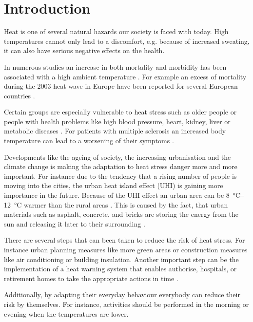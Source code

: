 
\section{Introduction}

Heat is one of several natural hazards our society is faced with today. High temperatures cannot only lead to a discomfort, e.g. because of increased sweating, it can also have serious negative effects on the health. 

In numerous studies an increase in both mortality and
morbidity has been associated with a high ambient temperature \parencite{Zacharias2014,Basu2009}. For example an excess of mortality during the 2003 heat wave in Europe have been reported for several European countries \parencite{Johnson2005,Kovats2004}. 

Certain groups are especially vulnerable to heat stress such as older people or people with health problems like high blood pressure,  heart, kidney, liver or
metabolic diseases  \parencite{Ebi2004,Huebler2007}. For patients with multiple sclerosis an increased body temperature can lead to a worsening of their symptoms \parencite{Guthrie1995,Davis2010}.

Developments like the ageing of society, the increasing urbanisation and the climate change is making the adaptation to heat stress danger more and more important. For instance due to the tendency that a rising number of people is moving into the cities, the urban heat island effect (UHI) is gaining more importance in the future. Because of the UHI effect an urban area can be  \SIrange{8}{12}{\celsius} warmer than the rural areas \parencite{Prashad2014}. This is caused by the fact, that urban materials such as asphalt, concrete, and bricks are storing the energy from the sun and releasing it later to their surrounding \parencite{Prashad2014}. 

There are several steps that can been taken to reduce the risk of heat stress. For instance urban planning measures like more green areas or construction measures like air conditioning or building insulation. Another important step can be the implementation of a heat warning system that enables authorise, hospitals, or retirement homes to take the appropriate actions in time \parencite{Ebi2004}.

Additionally, by adapting their everyday behaviour everybody can reduce their risk by themselves. For instance, activities should be performed in the morning or evening when the temperatures are lower.

